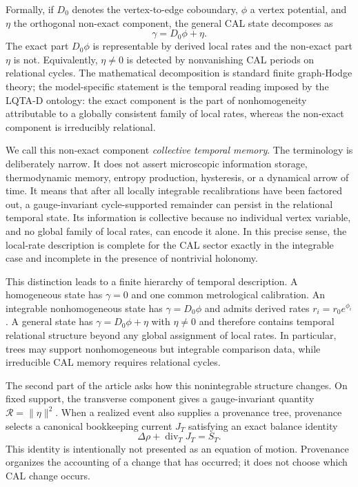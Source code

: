 \documentclass[aip,jmp,amsmath,amssymb,reprint]{revtex4-2}
\newcommand{\Rcal}{\mathcal{R}}
\newcommand{\divT}{\operatorname{div}_{T}}
\begin{document}
Formally, if $D_0$ denotes the vertex-to-edge coboundary, $\phi$ a vertex potential, and $\eta$ the orthogonal non-exact component, the general CAL state decomposes as
\begin{equation}
\gamma=D_0\phi+\eta.
\label{eq:intro-decomposition}
\end{equation}
The exact part $D_0\phi$ is representable by derived local rates and the non-exact part $\eta$ is not. Equivalently, $\eta\neq0$ is detected by nonvanishing CAL periods on relational cycles. The mathematical decomposition is standard finite graph-Hodge theory; the model-specific statement is the temporal reading imposed by the LQTA-D ontology: the exact component is the part of nonhomogeneity attributable to a globally consistent family of local rates, whereas the non-exact component is irreducibly relational.

We call this non-exact component \emph{collective temporal memory}. The terminology is deliberately narrow. It does not assert microscopic information storage, thermodynamic memory, entropy production, hysteresis, or a dynamical arrow of time. It means that after all locally integrable recalibrations have been factored out, a gauge-invariant cycle-supported remainder can persist in the relational temporal state. Its information is collective because no individual vertex variable, and no global family of local rates, can encode it alone. In this precise sense, the local-rate description is complete for the CAL sector exactly in the integrable case and incomplete in the presence of nontrivial holonomy.

This distinction leads to a finite hierarchy of temporal description. A homogeneous state has $\gamma=0$ and one common metrological calibration. An integrable nonhomogeneous state has $\gamma=D_0\phi$ and admits derived rates $r_i=r_0e^{\phi_i}$. A general state has $\gamma=D_0\phi+\eta$ with $\eta\neq0$ and therefore contains temporal relational structure beyond any global assignment of local rates. In particular, trees may support nonhomogeneous but integrable comparison data, while irreducible CAL memory requires relational cycles.

The second part of the article asks how this nonintegrable structure changes. On fixed support, the transverse component gives a gauge-invariant quantity $\Rcal=\|\eta\|^2$. When a realized event also supplies a provenance tree, provenance selects a canonical bookkeeping current $J_T$ satisfying an exact balance identity
\begin{equation}
\Delta\rho+\divT J_T=S_T.
\label{eq:intro-balance}
\end{equation}
This identity is intentionally not presented as an equation of motion. Provenance organizes the accounting of a change that has occurred; it does not choose which CAL change occurs.
\end{document}
